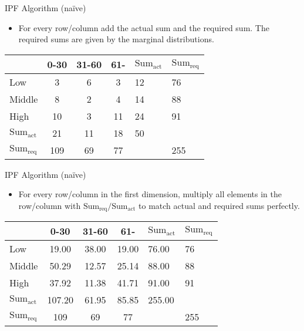 \documentclass{beamer}
\begin{document}
\newcommand{\sumact}{\ensuremath{\text{Sum}_{\text{act}}}}
\newcommand{\sumreq}{\ensuremath{\text{Sum}_{\text{req}}}}
\begin{frame}{IPF Algorithm (naïve)}
\begin{itemize}
\item For every row/column add the actual sum and the required sum.
  The required sums are given by the marginal distributions.
\end{itemize}

\begin{table}
\centering
\begin{tabular}{l||c c c||l|l}
      & 0-30 & 31-60 & 61- & \sumact{} & \sumreq{}\\
\hline \hline
Low      &   3 &   6 &   3 &  12 &  76 \\
Middle   &   8 &   2 &   4 &  14 &  88 \\
High     &  10 &   3 &  11 &  24 &  91 \\
\hline \hline
\sumact{}&  21 &  11 &  18 &  50 &     \\
\hline
\sumreq{}& 109 &  69 &  77 &     & 255 \\
\end{tabular}
\end{table}
\end{frame}


\begin{frame}{IPF Algorithm (naïve)}
\begin{itemize}
\item For every row/column in the first dimension, multiply all
  elements in the row/column with \(\sumreq{}/\sumact{}\)
  to match actual and required sums perfectly.
\end{itemize}

\begin{table}
\centering
\begin{tabular}{l||c c c||l|l}
         &  0-30 & 31-60 & 61-   & \sumact{} & \sumreq{}\\
\hline \hline
Low      &  19.00 &  38.00 &  19.00 &  76.00 &  76 \\
Middle   &  50.29 &  12.57 &  25.14 &  88.00 &  88 \\
High     &  37.92 &  11.38 &  41.71 &  91.00 &  91 \\
\hline \hline
\sumact{}& 107.20 &  61.95 &  85.85 & 255.00 &     \\
\hline
\sumreq{}& 109    &  69    &  77    &        & 255 \\
\end{tabular}
\end{table}
\end{frame}
\end{document}
